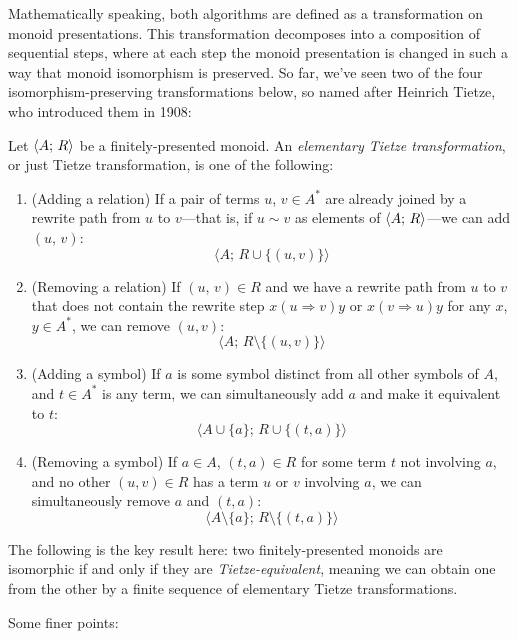 \documentclass[../generics]{subfiles}
\begin{document}
Mathematically speaking, both algorithms are defined as a transformation on monoid presentations. This transformation decomposes into a composition of sequential steps, where at each step the monoid presentation is changed in such a way that monoid isomorphism is preserved. So far, we've seen two of the four isomorphism-preserving transformations below, so named after Heinrich Tietze, who introduced them in 1908:
\begin{definition}
Let $\langle A;\,R\rangle$ be a finitely-presented monoid. An \emph{elementary Tietze transformation}, or just Tietze transformation, is one of the following:
\begin{enumerate}
\item (Adding a relation) If a pair of terms $u$, $v\in A^*$ are already joined by a rewrite path from $u$ to $v$---that is, if $u\sim v$ as elements of $\langle A;\,R\rangle$---we can add $(u,\,v)$:
\[\langle A;\,R\cup\{(u,v)\}\rangle\]
\item (Removing a relation) If $(u,\,v)\in R$ and we have a rewrite path from $u$ to $v$ that does not contain the rewrite step $x(u\Rightarrow v)y$ or $x(v\Rightarrow u)y$ for any $x$, $y\in A^*$, we can remove $(u,v)$:
\[\langle A;\,R\setminus\{(u,v)\}\rangle\]
\item (Adding a symbol) If $a$ is some symbol distinct from all other symbols of $A$, and $t\in A^*$ is any term, we can simultaneously add $a$ and make it equivalent to $t$:
\[\langle A\cup\{a\};\,R\cup\{(t,a)\}\rangle\]
\item (Removing a symbol) If $a\in A$, $(t,a)\in R$ for some term $t$ not involving $a$, and no other $(u,v)\in R$ has a term $u$ or $v$ involving $a$, we can simultaneously remove $a$ and $(t,a)$:
\[\langle A\setminus\{a\};\,R\setminus\{(t,a)\}\rangle\]
\end{enumerate}
The following is the key result here: two finitely-presented monoids are isomorphic if and only if they are \emph{Tietze-equivalent}, meaning we can obtain one from the other by a finite sequence of elementary Tietze transformations.
\end{definition}
Some finer points:
\end{document}
